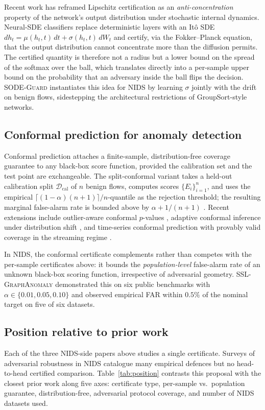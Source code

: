 \documentclass[journal,twoside]{IEEEtran}
\begin{document}
Recent work has reframed Lipschitz certification as an
\emph{anti-concentration} property of the network's output distribution
under stochastic internal dynamics. Neural-SDE classifiers
\cite{kong2020sde,liu2022nsde,chen2024sdeguard} replace deterministic
layers with an It\^o SDE
$dh_t = \mu(h_t,t)\,dt + \sigma(h_t,t)\,dW_t$ and certify, via the
Fokker--Planck equation, that the output distribution cannot concentrate
more than the diffusion permits. The certified quantity is therefore
not a radius but a lower bound on the spread of the softmax over the
ball, which translates directly into a per-sample upper bound on the
probability that an adversary inside the ball flips the decision.
\textsc{SODE-Guard} \cite{chen2024sdeguard} instantiates this idea for
NIDS by learning $\sigma$ jointly with the drift on benign flows,
sidestepping the architectural restrictions of GroupSort-style networks.

\subsection{Conformal prediction for anomaly detection}
Conformal prediction \cite{vovk2005algorithmic} attaches a
finite-sample, distribution-free coverage guarantee to any black-box
score function, provided the calibration set and the test point are
exchangeable. The split-conformal variant takes a held-out calibration
split $\mathcal{D}_{\mathrm{cal}}$ of $n$ benign flows, computes scores
$\{E_i\}_{i=1}^n$, and uses the empirical
$\lceil (1-\alpha)(n+1)\rceil/n$-quantile as the rejection threshold;
the resulting marginal false-alarm rate is bounded above by
$\alpha + 1/(n+1)$ \cite{angelopoulos2023gentle}. Recent extensions
include outlier-aware conformal $p$-values \cite{bates2023testing},
adaptive conformal inference under distribution shift
\cite{gibbs2021adaptive}, and time-series conformal prediction with
provably valid coverage in the streaming regime
\cite{xu2024conformaloos}.

In NIDS, the conformal certificate complements rather than competes with
the per-sample certificates above: it bounds the \emph{population-level}
false-alarm rate of an unknown black-box scoring function, irrespective
of adversarial geometry. \textsc{SSL-GraphAnomaly}
\cite{anaedevha2026sslgraph} demonstrated this on six public benchmarks
with $\alpha\in\{0.01,0.05,0.10\}$ and observed empirical FAR within
$0.5\%$ of the nominal target on five of six datasets.

\subsection{Position relative to prior work}
Each of the three NIDS-side papers above studies a single certificate.
Surveys of adversarial robustness in NIDS
\cite{zou2024adversarialNIDS,zhao2025gnnsurvey} catalogue many empirical
defences but no head-to-head certified comparison.
Table~\ref{tab:position} contrasts this proposal with the closest prior
work along five axes: certificate type, per-sample vs.\ population
guarantee, distribution-free, adversarial protocol coverage, and number
of NIDS datasets used.
\end{document}

